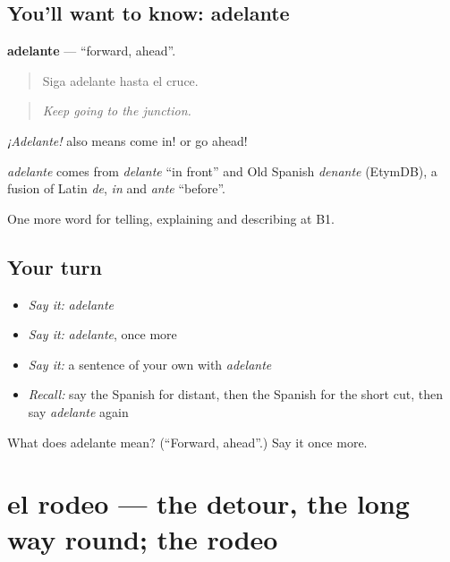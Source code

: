 \subsection*{You'll want to know: adelante}
\textbf{adelante} — \textquotedblleft{}forward, ahead\textquotedblright{}.

\begin{quote}
Siga adelante hasta el cruce.
\end{quote}

\begin{quote}
\emph{Keep going to the junction.}
\end{quote}

\emph{¡Adelante!} also means come in! or go ahead!

\begin{cousinweb}
\emph{adelante} comes from \emph{delante} \textquotedblleft{}in front\textquotedblright{} and Old Spanish \emph{denante} (EtymDB), a fusion of Latin \emph{de}, \emph{in} and \emph{ante} \textquotedblleft{}before\textquotedblright{}.
\end{cousinweb}

\begin{grammarlens}[title={What you've built}]
One more word for telling, explaining and describing at B1.
\end{grammarlens}

\subsection*{Your turn}
\begin{itemize}
\raggedright
  \item \emph{Say it:} \emph{adelante}
  \item \emph{Say it:} \emph{adelante}, once more
  \item \emph{Say it:} a sentence of your own with \emph{adelante}
  \item \emph{Recall:} say the Spanish for distant, then the Spanish for the short cut, then say \emph{adelante} again
\end{itemize}

\begin{tcolorbox}[breakable,colback=teal!4,colframe=teal!35!black,title={Before you move on}]
What does adelante mean? (\textquotedblleft{}Forward, ahead\textquotedblright{}.) Say it once more.
\end{tcolorbox}
\section[el rodeo]{el rodeo — the detour, the long way round; the rodeo}

